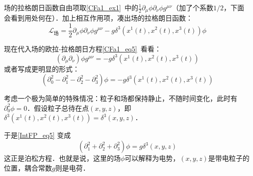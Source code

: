 场的拉格朗日函数自由项取\autoref{CFa1_ex1}~中的$\frac{1}{2}\partial_\mu\phi\partial_\nu\phi g^{\mu\nu}$（加了个系数$1/2$，下面会看到用处何在）．加上相互作用项，凑出场的拉格朗日函数：
\begin{equation}
\mathcal{L}_{\text{场}} = \frac{1}{2}\partial_\mu\phi\partial_\nu\phi g^{\mu\nu} - g\delta^3(x^1(t), x^2(t), x^3(t))\phi
\end{equation}

现在代入场的欧拉-拉格朗日方程\autoref{CFa1_eq5}~看看：
\begin{equation}
(\partial_\mu\partial_\nu)\phi g^{\mu\nu} = -g\delta^3(x^1(t), x^2(t), x^3(t))
\end{equation}
或者写成更明显的形式：
\begin{equation}\label{IntFP_eq5}
(\partial_0^2-\partial_1^2-\partial_2^2-\partial_3^2)\phi = -g\delta^3(x^1(t), x^2(t), x^3(t))
\end{equation}

考虑一个极为简单的特殊情况：粒子和场都保持静止，不随时间变化，此时有$\partial_0^2\phi = 0$．假设粒子总待在点$(x, y, z)$，即$\delta^3(x^1(t), x^2(t), x^3(t))=\delta^3(x, y, z)$．

于是\autoref{IntFP_eq5} 变成
\begin{equation}
(\partial_1^2+\partial_2^2+\partial_3^2)\phi = g\delta^3(x, y, z)
\end{equation}
这正是泊松方程．也就是说，这里的场$\phi$可以解释为电势，$(x, y, z)$是带电粒子的位置，耦合常数$g$则是电荷．















